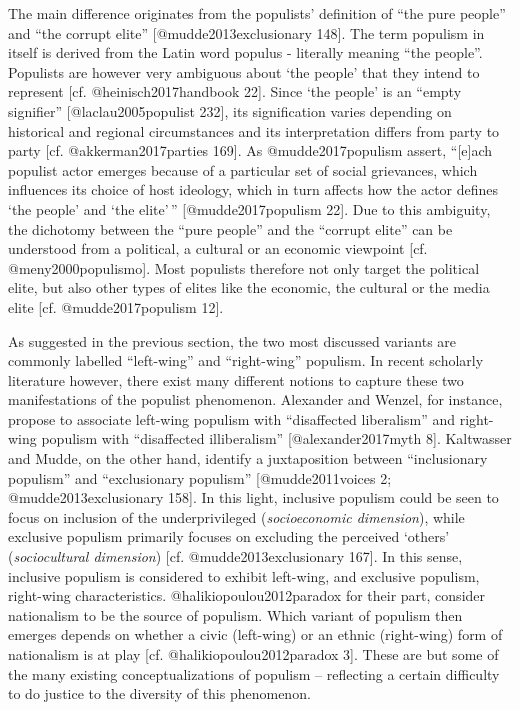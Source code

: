 \documentclass[]{article}
\begin{document}
The main difference originates from the populists' definition of ``the
pure people'' and ``the corrupt elite'' {[}@mudde2013exclusionary
148{]}. The term populism in itself is derived from the Latin word
populus - literally meaning ``the people''. Populists are however very
ambiguous about `the people' that they intend to represent {[}cf.
@heinisch2017handbook 22{]}. Since `the people' is an ``empty
signifier'' {[}@laclau2005populist 232{]}, its signification varies
depending on historical and regional circumstances and its
interpretation differs from party to party {[}cf. @akkerman2017parties
169{]}. As @mudde2017populism assert, ``{[}e{]}ach populist actor
emerges because of a particular set of social grievances, which
influences its choice of host ideology, which in turn affects how the
actor defines `the people' and `the elite'\,'' {[}@mudde2017populism
22{]}. Due to this ambiguity, the dichotomy between the ``pure people''
and the ``corrupt elite'' can be understood from a political, a cultural
or an economic viewpoint {[}cf. @meny2000populismo{]}. Most populists
therefore not only target the political elite, but also other types of
elites like the economic, the cultural or the media elite {[}cf.
@mudde2017populism 12{]}.

As suggested in the previous section, the two most discussed variants
are commonly labelled ``left-wing'' and ``right-wing'' populism. In
recent scholarly literature however, there exist many different notions
to capture these two manifestations of the populist phenomenon.
Alexander and Wenzel, for instance, propose to associate left-wing
populism with ``disaffected liberalism'' and right-wing populism with
``disaffected illiberalism'' {[}@alexander2017myth 8{]}. Kaltwasser and
Mudde, on the other hand, identify a juxtaposition between
``inclusionary populism'' and ``exclusionary populism''
{[}@mudde2011voices 2; @mudde2013exclusionary 158{]}. In this light,
inclusive populism could be seen to focus on inclusion of the
underprivileged (\emph{socioeconomic dimension}), while exclusive
populism primarily focuses on excluding the perceived `others'
(\emph{sociocultural dimension}) {[}cf. @mudde2013exclusionary 167{]}.
In this sense, inclusive populism is considered to exhibit left-wing,
and exclusive populism, right-wing characteristics.
@halikiopoulou2012paradox for their part, consider nationalism to be the
source of populism. Which variant of populism then emerges depends on
whether a civic (left-wing) or an ethnic (right-wing) form of
nationalism is at play {[}cf. @halikiopoulou2012paradox 3{]}. These are
but some of the many existing conceptualizations of populism --
reflecting a certain difficulty to do justice to the diversity of this
phenomenon.
\end{document}
